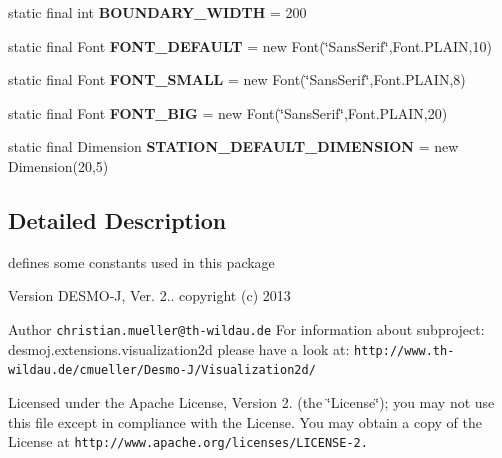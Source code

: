 \begin{DoxyCompactItemize}
\item 
static final int {\bfseries B\-O\-U\-N\-D\-A\-R\-Y\-\_\-\-W\-I\-D\-T\-H} = 200\label{interfacedesmoj_1_1extensions_1_1visualization2d_1_1engine_1_1model_grafic_1_1_grafic_a6e21ab7291bb6071ac1dafa8c0f638fc}

\item 
static final Font {\bfseries F\-O\-N\-T\-\_\-\-D\-E\-F\-A\-U\-L\-T} = new Font(\char`\"{}Sans\-Serif\char`\"{},Font.\-P\-L\-A\-I\-N,10)\label{interfacedesmoj_1_1extensions_1_1visualization2d_1_1engine_1_1model_grafic_1_1_grafic_a03d98aab9fc79154a2593e69346dac8b}

\item 
static final Font {\bfseries F\-O\-N\-T\-\_\-\-S\-M\-A\-L\-L} = new Font(\char`\"{}Sans\-Serif\char`\"{},Font.\-P\-L\-A\-I\-N,8)\label{interfacedesmoj_1_1extensions_1_1visualization2d_1_1engine_1_1model_grafic_1_1_grafic_a263d82b18dfc298a61bb262b3799c88f}

\item 
static final Font {\bfseries F\-O\-N\-T\-\_\-\-B\-I\-G} = new Font(\char`\"{}Sans\-Serif\char`\"{},Font.\-P\-L\-A\-I\-N,20)\label{interfacedesmoj_1_1extensions_1_1visualization2d_1_1engine_1_1model_grafic_1_1_grafic_ab96eb59dc8f9b8f741cd003cdaa5a6b2}

\item 
static final Dimension {\bfseries S\-T\-A\-T\-I\-O\-N\-\_\-\-D\-E\-F\-A\-U\-L\-T\-\_\-\-D\-I\-M\-E\-N\-S\-I\-O\-N} = new Dimension(20,5)\label{interfacedesmoj_1_1extensions_1_1visualization2d_1_1engine_1_1model_grafic_1_1_grafic_a45054db83047c3486d6170272534841e}

\end{DoxyCompactItemize}


\subsection{Detailed Description}
defines some constants used in this package

\begin{DoxyVersion}{Version}
D\-E\-S\-M\-O-\/\-J, Ver. 2.. copyright (c) 2013 
\end{DoxyVersion}
\begin{DoxyAuthor}{Author}
{\tt christian.\-mueller@th-\/wildau.\-de} For information about subproject\-: desmoj.\-extensions.\-visualization2d please have a look at\-: {\tt http\-://www.\-th-\/wildau.\-de/cmueller/\-Desmo-\/\-J/\-Visualization2d/}
\end{DoxyAuthor}
Licensed under the Apache License, Version 2. (the \char`\"{}\-License\char`\"{}); you may not use this file except in compliance with the License. You may obtain a copy of the License at {\tt http\-://www.\-apache.\-org/licenses/\-L\-I\-C\-E\-N\-S\-E-\/2.}

